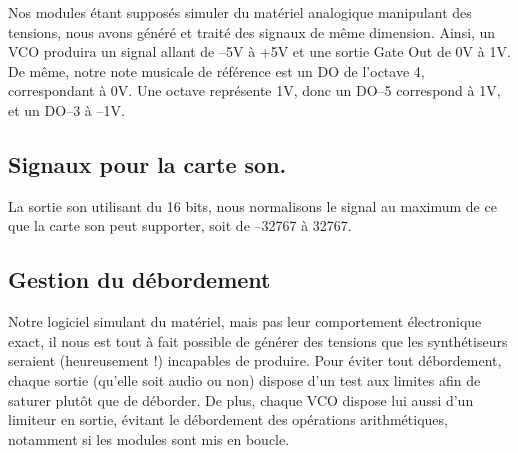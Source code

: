 Nos modules étant supposés simuler du matériel analogique
manipulant des tensions, nous avons généré et traité des signaux de
même dimension. Ainsi, un VCO produira un signal allant de --5V à
+5V et une sortie Gate Out de 0V à 1V. De même, notre note musicale
de référence est un DO de l'octave 4, correspondant à 0V. Une
octave représente 1V, donc un DO--5 correspond à 1V, et un DO--3 à
--1V.

\subsection{Signaux pour la carte son.}

La sortie son utilisant du 16 bits, nous normalisons le signal au
maximum de ce que la carte son peut supporter, soit de --32767 à
32767.

\subsection{Gestion du débordement}

Notre logiciel simulant du matériel, mais pas leur comportement
électronique exact, il nous est tout à fait possible de générer des
tensions que les synthétiseurs seraient (heureusement !) incapables
de produire. Pour éviter tout débordement, chaque sortie (qu'elle
soit audio ou non) dispose d'un test aux limites afin de saturer
plutôt que de déborder. De plus, chaque VCO dispose lui aussi d'un
limiteur en sortie, évitant le débordement des opérations
arithmétiques, notamment si les modules sont mis en boucle.

